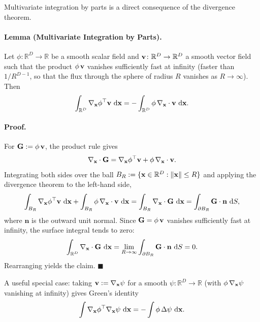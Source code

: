 \begin{nknote}
Multivariate integration by parts is a direct consequence of the divergence theorem.

\paragraph{Lemma (Multivariate Integration by Parts).}
Let $\phi \colon \mathbb{R}^D \to \mathbb{R}$ be a smooth scalar field and ${\mathbf{v}} \colon \mathbb{R}^D \to \mathbb{R}^D$ a smooth vector field such that the product $\phi\,{\mathbf{v}}$ vanishes sufficiently fast at infinity (faster than $1/R^{D-1}$, so that the flux through the sphere of radius $R$ vanishes as $R \to \infty$). Then
\[
\int_{\mathbb{R}^D} \nabla_{{\mathbf{x}}}\phi^\top {\mathbf{v}} \,\mathop{}\!\mathrm{d}{\mathbf{x}}
= -\int_{\mathbb{R}^D} \phi\, \nabla_{{\mathbf{x}}}\cdot{\mathbf{v}} \,\mathop{}\!\mathrm{d}{\mathbf{x}} .
\]

\paragraph{Proof.}
For ${\mathbf{G}} := \phi\,{\mathbf{v}}$, the product rule gives
\[
\nabla_{{\mathbf{x}}}\cdot{\mathbf{G}} = \nabla_{{\mathbf{x}}}\phi^\top {\mathbf{v}} + \phi\,\nabla_{{\mathbf{x}}}\cdot{\mathbf{v}} .
\]
Integrating both sides over the ball $B_R := \{{\mathbf{x}} \in \mathbb{R}^D : \|{\mathbf{x}}\| \le R\}$ and applying the divergence theorem to the left-hand side,
\[
\int_{B_R} \nabla_{{\mathbf{x}}}\phi^\top {\mathbf{v}}\,\mathop{}\!\mathrm{d}{\mathbf{x}}
+ \int_{B_R} \phi\,\nabla_{{\mathbf{x}}}\cdot{\mathbf{v}}\,\mathop{}\!\mathrm{d}{\mathbf{x}}
= \int_{B_R} \nabla_{{\mathbf{x}}}\cdot{\mathbf{G}}\,\mathop{}\!\mathrm{d}{\mathbf{x}}
= \int_{\partial B_R} {\mathbf{G}}\cdot\mathbf{n}\,\mathop{}\!\mathrm{d} S ,
\]
where $\mathbf{n}$ is the outward unit normal. Since ${\mathbf{G}} = \phi\,{\mathbf{v}}$ vanishes sufficiently fast at infinity, the surface integral tends to zero:
\[
\int_{\mathbb{R}^D} \nabla_{{\mathbf{x}}}\cdot{\mathbf{G}}\,\mathop{}\!\mathrm{d}{\mathbf{x}}
= \lim_{R\to\infty} \int_{\partial B_R} {\mathbf{G}}\cdot\mathbf{n}\,\mathop{}\!\mathrm{d} S
= 0 .
\]
Rearranging yields the claim. \hfill$\blacksquare$

A useful special case: taking ${\mathbf{v}} := \nabla_{{\mathbf{x}}}\psi$ for a smooth $\psi \colon \mathbb{R}^D \to \mathbb{R}$ (with $\phi\,\nabla_{{\mathbf{x}}}\psi$ vanishing at infinity) gives Green's identity
\[
\int \nabla_{{\mathbf{x}}}\phi^\top \nabla_{{\mathbf{x}}}\psi \,\mathop{}\!\mathrm{d}{\mathbf{x}}
= -\int \phi\, \Delta\psi \,\mathop{}\!\mathrm{d}{\mathbf{x}} .
\]
\end{nknote}

\section{\texorpdfstring{}{Jensen's Inequality}}\label{app-sec:jensen}

